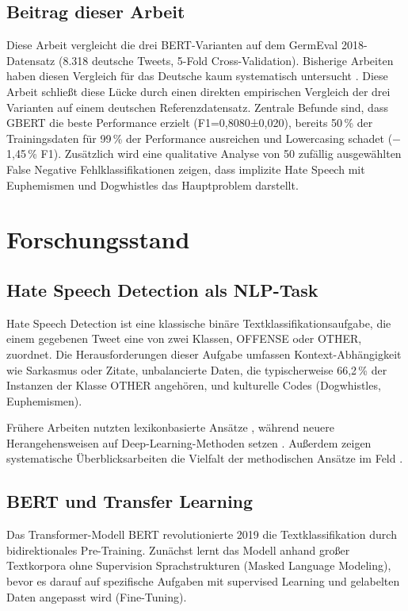 ﻿\documentclass[11pt,a4paper]{article}
\begin{document}
\subsection*{Beitrag dieser Arbeit}

Diese Arbeit vergleicht die drei BERT-Varianten auf dem GermEval 2018-Datensatz (8.318 deutsche Tweets, 5-Fold Cross-Validation). Bisherige Arbeiten haben diesen Vergleich für das Deutsche kaum systematisch untersucht \parencite{wiegand2018}. Diese Arbeit schließt diese Lücke durch einen direkten empirischen Vergleich der drei Varianten auf einem deutschen Referenzdatensatz. 
Zentrale Befunde sind, dass GBERT die beste Performance erzielt  (F1=0,8080±0,020), bereits 50\,\% der Trainingsdaten für 99\,\% der Performance ausreichen und Lowercasing schadet ($-$1{,}45\,\% F1). 
Zusätzlich wird eine qualitative Analyse von 50 zufällig ausgewählten False Negative Fehlklassifikationen zeigen, dass implizite Hate Speech mit Euphemismen und Dogwhistles das Hauptproblem darstellt.
\clearpage


\section{Forschungsstand}


\subsection{Hate Speech Detection als NLP-Task}

Hate Speech Detection ist eine klassische binäre Textklassifikationsaufgabe, die  einem gegebenen Tweet eine von zwei Klassen, OFFENSE oder OTHER, zuordnet. Die Herausforderungen dieser Aufgabe umfassen Kontext-Abhängigkeit wie Sarkasmus oder Zitate, unbalancierte Daten, die typischerweise 66,2\,\% der Instanzen der Klasse OTHER angehören, und kulturelle Codes (Dogwhistles, Euphemismen). 

Frühere Arbeiten nutzten lexikonbasierte Ansätze \parencite{schmidt2017}, während neuere Herangehensweisen auf Deep-Learning-Methoden setzen \parencite{davidson2017}. Außerdem zeigen systematische Überblicksarbeiten die Vielfalt der methodischen Ansätze im Feld \parencite{fortuna2018}.


\subsection{BERT und Transfer Learning}

Das Transformer-Modell BERT \parencite{devlin2019} revolutionierte 2019 die Textklassifikation durch bidirektionales Pre-Training. Zunächst lernt das Modell anhand großer Textkorpora ohne Supervision Sprachstrukturen (Masked Language Modeling), bevor es darauf auf spezifische Aufgaben mit supervised Learning und gelabelten Daten angepasst wird (Fine-Tuning). 
\end{document}
